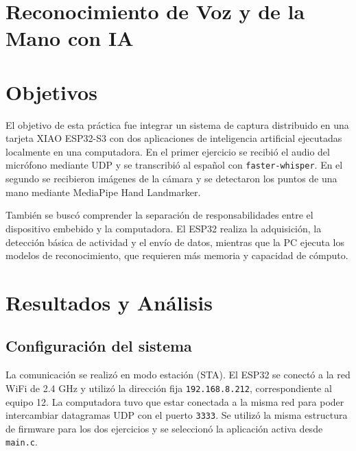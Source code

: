 \documentclass[12pt, letterpaper]{article}
\begin{document}



\normalsize

\section*{\centering \fontsize{14}{17}\sffamily\selectfont Reconocimiento de Voz y de la Mano con IA}

\section*{\centering \fontsize{14}{17}\sffamily\selectfont Objetivos}

El objetivo de esta práctica fue integrar un sistema de captura distribuido en
una tarjeta XIAO ESP32-S3 con dos aplicaciones de inteligencia artificial
ejecutadas localmente en una computadora. En el primer ejercicio se recibió el
audio del micrófono mediante UDP y se transcribió al español con
\texttt{faster-whisper}. En el segundo se recibieron imágenes de la cámara y se
detectaron los puntos de una mano mediante MediaPipe Hand Landmarker.

También se buscó comprender la separación de responsabilidades entre el
dispositivo embebido y la computadora. El ESP32 realiza la adquisición, la
detección básica de actividad y el envío de datos, mientras que la PC ejecuta
los modelos de reconocimiento, que requieren más memoria y capacidad de
cómputo.

\section*{\centering \fontsize{14}{17}\sffamily\selectfont Resultados y Análisis}

\subsection*{\fontsize{12}{17}\sffamily\selectfont Configuración del sistema}

La comunicación se realizó en modo estación (STA). El ESP32 se conectó a la red
WiFi de 2.4 GHz y utilizó la dirección fija \texttt{192.168.8.212},
correspondiente al equipo 12. La computadora tuvo que estar conectada a la
misma red para poder intercambiar datagramas UDP con el puerto \texttt{3333}.
Se utilizó la misma estructura de firmware para los dos ejercicios y se
seleccionó la aplicación activa desde \texttt{main.c}.
\end{document}
